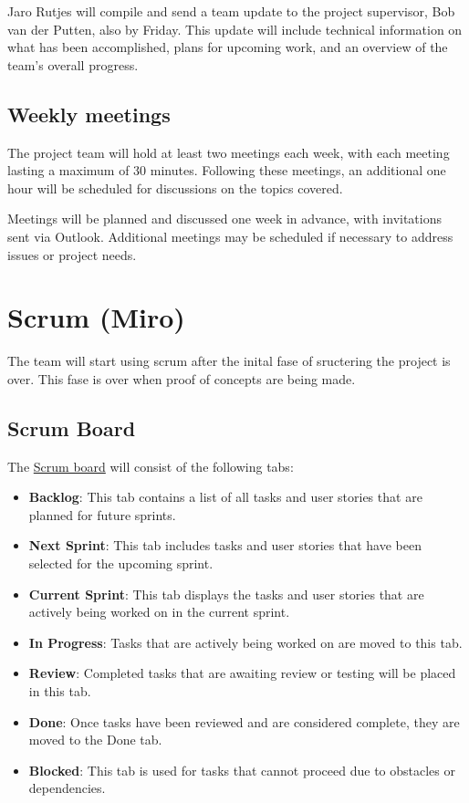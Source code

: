 \documentclass{projdoc}
\begin{document}
Jaro Rutjes will compile and send a team update to the project supervisor,
Bob van der Putten, also by Friday. This update will include technical 
information on what has been accomplished, plans for upcoming work, and an 
overview of the team's overall progress.

\subsection{Weekly meetings}
The project team will hold at least two meetings each week, with each meeting 
lasting a maximum of 30 minutes. Following these meetings, an additional one 
hour will be scheduled for discussions on the topics covered.

Meetings will be planned and discussed one week in advance, with invitations 
sent via Outlook. Additional meetings may be scheduled if necessary to address 
issues or project needs.

\newpage

\section{Scrum (Miro)}

The team will start using scrum after the inital fase of sructering the project is over.
This fase is over when proof of concepts are being made.

\subsection{Scrum Board}
The \href{https://miro.com/app/board/uXjVKjtdM64=/?share_link_id=303851465474}{Scrum board} will consist of the following tabs:
 
\begin{itemize}
    \item \textbf{Backlog}: This tab contains a list of all tasks and user stories that are planned for future sprints.
    \item \textbf{Next Sprint}: This tab includes tasks and user stories that have been selected for the upcoming sprint.
    \item \textbf{Current Sprint}: This tab displays the tasks and user stories that are actively being worked on in the current sprint.
    \item \textbf{In Progress}: Tasks that are actively being worked on are moved to this tab.
    \item \textbf{Review}: Completed tasks that are awaiting review or testing will be placed in this tab.
    \item \textbf{Done}: Once tasks have been reviewed and are considered complete, they are moved to the Done tab.
    \item \textbf{Blocked}: This tab is used for tasks that cannot proceed due to obstacles or dependencies.
\end{itemize}
\end{document}
